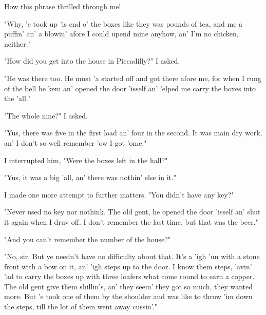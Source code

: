 How this phrase thrilled through me! 

"Why, 'e took up 'is end o' the boxes like they was pounds of tea, and me a puffin' an' a blowin' afore I could upend mine anyhow, an' I'm no chicken, neither." 

"How did you get into the house in Piccadilly?" I asked. 

"He was there too. He must 'a started off and got there afore me, for when I rung of the bell he kem an' opened the door 'isself an' 'elped me carry the boxes into the 'all." 

"The whole nine?" I asked. 

"Yus, there was five in the first load an' four in the second. It was main dry work, an' I don't so well remember 'ow I got 'ome." 

I interrupted him, "Were the boxes left in the hall?" 

"Yus, it was a big 'all, an' there was nothin' else in it." 

I made one more attempt to further matters. "You didn't have any key?" 

"Never used no key nor nothink. The old gent, he opened the door 'isself an' shut it again when I druv off. I don't remember the last time, but that was the beer." 

"And you can't remember the number of the house?" 

"No, sir. But ye needn't have no difficulty about that. It's a 'igh 'un with a stone front with a bow on it, an' 'igh steps up to the door. I know them steps, 'avin' 'ad to carry the boxes up with three loafers what come round to earn a copper. The old gent give them shillin's, an' they seein' they got so much, they wanted more. But 'e took one of them by the shoulder and was like to throw 'im down the steps, till the lot of them went away cussin'." 

